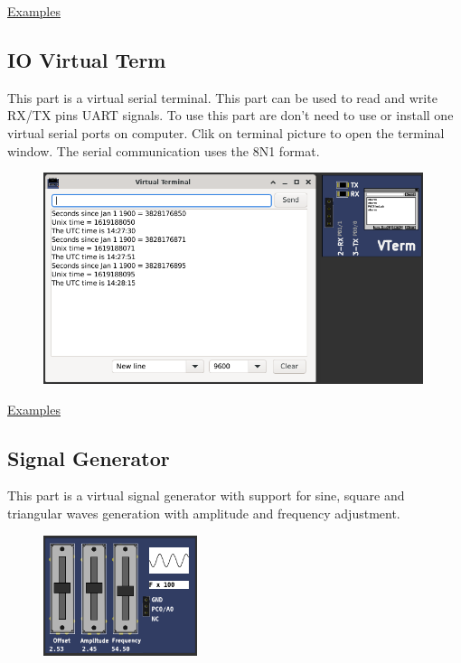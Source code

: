 \href{https://lcgamboa.github.io/picsimlab_examples/Parts.html\#D._Transfer_Function}{Examples}

\subsection{IO Virtual Term} \hypertarget{def:vterm}{}

This part is a virtual serial terminal. This part can be used to read and write RX/TX pins UART signals.
To use this part are don't need to use or install one virtual serial ports on computer.  
Clik on terminal picture to open the terminal window.
The serial communication uses the 8N1 format.

\begin{figure}[H]
\center
\includegraphics[width=0.99\textwidth]{img/part_vterm.png} 
\end{figure} 

\href{https://lcgamboa.github.io/picsimlab_examples/Parts.html\#IO_Virtual_Term}{Examples}

\subsection{Signal Generator}

This part is a virtual signal generator with support for sine, square and triangular waves 
generation with amplitude and frequency adjustment.

\begin{figure}[H]
\center
\includegraphics[width=0.4\textwidth]{img/part_sgen.png} 
\end{figure}


